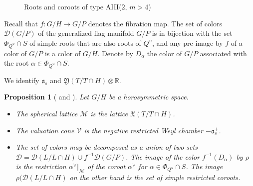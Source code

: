 \documentclass{amsart}
\newtheorem{prop}[thm]{Proposition}
\theoremstyle{definition}
\begin{document}
\begin{figure}
\centering
\caption{
Roots and coroots of type AIII($2$, $m>4$)}
\label{fig_coroots_AIII}
\end{figure}

Recall that $f:G/H\rightarrow G/P$ denotes the fibration map. 
The set of colors $\mathcal{D}(G/P)$ of the generalized flag manifold 
$G/P$ is in bijection with the set $\Phi_{Q^u}\cap S$ of  
simple roots that are also roots of $Q^u$, 
and any pre-image by $f$ of a color of $G/P$ is a 
color of $G/H$. Denote by $D_{\alpha}$ the color of $G/P$ 
associated with the root $\alpha\in \Phi_{Q^u}\cap S$. 

We identify $\mathfrak{a}_s$ and $\mathfrak{Y}(T/T\cap H)\otimes \mathbb{R}$.

\begin{prop}[{\cite[Proposition 20.4]{Tim11} and \cite{Vus90}}]
\label{prop_colored_data}
Let $G/H$ be a horosymmetric space.
\begin{itemize}
\item 
The spherical lattice $\mathcal{M}$ is the lattice $\mathfrak{X}(T/T\cap H)$. 
\item 
The valuation cone $\mathcal{V}$ is the 
negative restricted Weyl chamber $-\mathfrak{a}_s^+$.
\item 
The set of colors may be decomposed as a union of two sets 
$\mathcal{D}=\mathcal{D}(L/L\cap H) \cup f^{-1}\mathcal{D}(G/P)$.
The image of the color $f^{-1}(D_{\alpha})$ by $\rho$   
is the restriction $\alpha^{\vee}|_{\mathcal{M}}$ of the coroot $\alpha^{\vee}$ 
for $\alpha\in \Phi_{Q^u}\cap S$.   
The image $\rho(\mathcal{D}(L/L\cap H)$
on the other hand is the set of simple restricted coroots. 
\end{itemize}
\end{prop}
\end{document}
